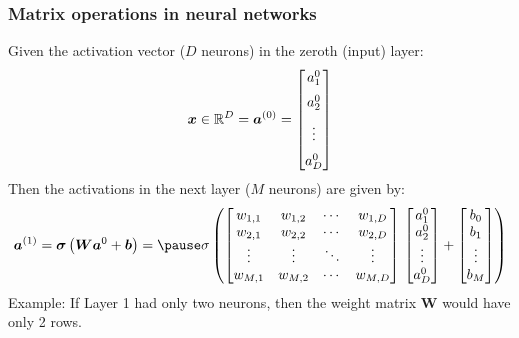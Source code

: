 \documentclass[smaller]{beamer}
\begin{document}
\begin{frame}
  \frametitle{Matrix operations in neural networks}
  \pause

  Given the activation vector ($D$ neurons) in the zeroth (input) layer:
  \begin{equation}
   \bm x \in \mathbb{R}^D = \bm a^{(0)} =   \begin{bmatrix}
    a_1^{0}\\[2mm]
    a_2^{0}\\[2mm]
    \vdots \\[2mm]
    a_D^{0}\\
    \end{bmatrix}
  \end{equation}
  \pause
  Then the activations in the next layer ($M$ neurons) are given by:\pause
  \begin{equation}
    \bm{a}^{(1)}=
    \bm\sigma\left(
    \boldsymbol{W}\bm a^{0}+ \bm b
  \right)
  = \pause
  \sigma \left(
    \begin{bmatrix}
      w_{1,1} & w_{1,2} & \cdots & w_{1,D}\\
      w_{2,1} & w_{2,2} & \cdots & w_{2,D}\\
      \vdots & \vdots & \ddots & \vdots \\
    w_{M,1} & w_{M,2} & \cdots & w_{M,D}\\
    \end{bmatrix}
    \, 
    \begin{bmatrix}
    a_1^{0}\\
    a_2^{0}\\
    \vdots \\
    a_{D}^{0}\\
    \end{bmatrix}
    +
    \begin{bmatrix}
    b_0\\
    b_1\\
    \vdots \\
    b_{M}\\
    \end{bmatrix}
    \right)
  \end{equation}
  \pause
  Example: If Layer 1 had only two neurons, then the weight matrix $\bm W$ would have only 2 rows.
\end{frame}
\end{document}
